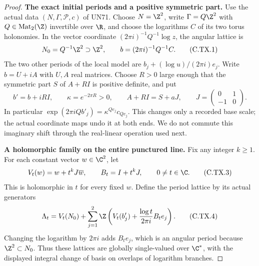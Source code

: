 \begin{proof}
\par\medskip\noindent\textbf{The exact initial periods and a positive symmetric part.}
Use the actual data $(N,\Gamma,\mathscr P,c)$ of UN71.
Choose $N=\Z^2$, write $\Gamma=Q\Z^2$ with
$Q\in\operatorname{Mat}_2(\Z)$ invertible over $\R$,
and choose the logarithms $C$ of its two torus
holonomies. In the vector coordinate
$(2\pi i)^{-1}Q^{-1}\log z$, the angular lattice is
\[
        N_0=Q^{-1}\Z^2\supset\Z^2,
             \qquad b=(2\pi i)^{-1}Q^{-1}C.
\tag{C.TX.1}
\]
The two other periods of the local model are
$b_j+(\log u)/(2\pi i)e_j$. Write $b=U+iA$
with $U,A$ real matrices. Choose $R>0$ large enough
that the symmetric part $S$ of $A+RI$ is positive
definite, and put
\[
 b'=b+iRI,
 \qquad \kappa=e^{-2\pi R}>0,
 \qquad A+RI=S+aJ,
 \qquad J=\begin{pmatrix}0&1\\-1&0\end{pmatrix}.
\tag{C.TX.2}
\]
In particular
$\exp(2\pi iQb'_j)=\kappa^{Qe_j}c_{Qe_j}$.
This changes only a recorded base scale; the
actual coordinate maps undo it at both ends.
We do not commute this imaginary shift through
the real-linear operation used next.

\par\medskip\noindent\textbf{A holomorphic family on the entire punctured line.}
Fix any integer $k\ge1$. For each constant
vector $w\in\C^2$, let
\[
 V_t(w)=w+t^kJ\overline w,
 \qquad B_t=I+t^kJ,
 \qquad 0\ne t\in\C.
\tag{C.TX.3}
\]
This is holomorphic in $t$ for every fixed $w$.
Define the period lattice by its actual generators
\[
 \Lambda_t=V_t(N_0)
   +\sum_{j=1}^2\Z
       \left(V_t(b'_j)+\frac{\log t}{2\pi i}B_te_j\right).
\tag{C.TX.4}
\]
Changing the logarithm by $2\pi i$ adds $B_te_j$,
which is an angular period because $\Z^2\subset N_0$.
Thus these lattices are globally single-valued
over $\C^*$, with the displayed integral change
of basis on overlaps of logarithm branches.


\end{proof}
